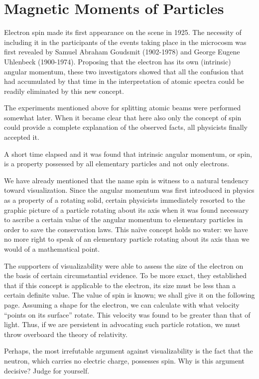 \section{Magnetic Moments of Particles}

Electron spin made its first appearance on the scene in 1925. The necessity of including it in the participants of the events taking place in the microcosm was first revealed by Samuel Abraham Goudsmit (1902-1978) and George Eugene Uhlenbeck (1900-1974). Proposing that the electron has its own (intrinsic) angular momentum, these two investigators showed that all the confusion that had accumulated by that time in the interpretation of atomic spectra could be readily eliminated by this new concept.

The experiments mentioned above for splitting atomic beams were performed somewhat later. When it became clear that here also only the concept of spin could provide a complete explanation of the observed facts, all physicists finally accepted it.

A short time elapsed and it was found that intrinsic angular momentum, or spin, is a property possessed by all elementary particles and not only electrons.

We have already mentioned that the name spin is witness to a natural tendency toward visualization. Since the angular momentum was first introduced in physics as a property of a rotating solid, certain physicists immediately resorted to the graphic picture of a particle rotating about its axis when it was found necessary to ascribe a certain value of the angular momentum to elementary particles in order to save the conservation laws. This na\"ive concept holds no water: we have no more right to speak of an elementary particle rotating about its axis than we would of a mathematical point.

The supporters of visualizability were able to assess the size of the electron on the basis of certain circumstantial evidence. To be more exact, they established that if this concept is applicable to the electron, its size must be less than a certain definite value. The value of spin is known; we shall give it on the following page. Assuming a shape for the electron, we can calculate with what velocity ``points on its surface'' rotate. This velocity was found to be greater than that of light. Thus, if we are persistent in advocating such particle rotation, we must throw overboard the theory of relativity.


Perhaps, the most irrefutable argument against visualizability is the fact that the neutron, which carries no electric charge, possesses spin. Why is this argument decisive? Judge for yourself.

